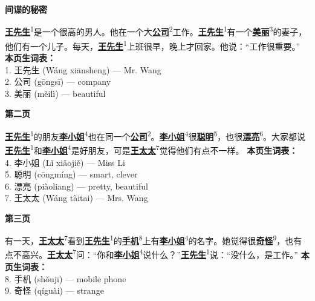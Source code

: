 \documentclass[20pt]{extarticle}
\newcommand{\glossedword}[2]{\uline{\textbf{#1}}\textsuperscript{#2}}
\begin{document}
\begin{center}
    {\fontsize{36}{44}\selectfont \textbf{间谍的秘密}}
\end{center}
\vspace{2em}
{\fontsize{22}{30}\selectfont
\noindent
\glossedword{王先生}{1}是一个很高的男人。他在一个大\glossedword{公司}{2}工作。\glossedword{王先生}{1}有一个\glossedword{美丽}{3}的妻子，他们有一个儿子。每天，\glossedword{王先生}{1}上班很早，晚上才回家。他说：“工作很重要。”
}
\vfill
{\fontsize{18}{26}\selectfont
\noindent
\textbf{本页生词表：}\\[0.5em]
1. 王先生 (Wáng xiānsheng) — Mr. Wang\\
2. 公司 (gōngsī) — company\\
3. 美丽 (měilì) — beautiful
}
\newpage

\begin{center}
    {\fontsize{36}{44}\selectfont \textbf{第二页}}
\end{center}
\vspace{2em}
{\fontsize{22}{30}\selectfont
\noindent
\glossedword{王先生}{1}的朋友\glossedword{李小姐}{4}也在同一个\glossedword{公司}{2}。\glossedword{李小姐}{4}很\glossedword{聪明}{5}，也很\glossedword{漂亮}{6}。大家都说\glossedword{王先生}{1}和\glossedword{李小姐}{4}是好朋友，可是\glossedword{王太太}{7}觉得他们有点不一样。
}
\vfill
{\fontsize{18}{26}\selectfont
\noindent
\textbf{本页生词表：}\\[0.5em]
4. 李小姐 (Lǐ xiǎojiě) — Miss Li\\
5. 聪明 (cōngmíng) — smart, clever\\
6. 漂亮 (piàoliang) — pretty, beautiful\\
7. 王太太 (Wáng tàitai) — Mrs. Wang
}
\newpage

\begin{center}
    {\fontsize{36}{44}\selectfont \textbf{第三页}}
\end{center}
\vspace{2em}
{\fontsize{22}{30}\selectfont
\noindent
有一天，\glossedword{王太太}{7}看到\glossedword{王先生}{1}的\glossedword{手机}{8}上有\glossedword{李小姐}{4}的名字。她觉得很\glossedword{奇怪}{9}，也有点不高兴。\glossedword{王太太}{7}问：“你和\glossedword{李小姐}{4}说什么？”\glossedword{王先生}{1}说：“没什么，是工作。”
}
\vfill
{\fontsize{18}{26}\selectfont
\noindent
\textbf{本页生词表：}\\[0.5em]
8. 手机 (shǒujī) — mobile phone\\
9. 奇怪 (qíguài) — strange
}
\newpage
\end{document}
